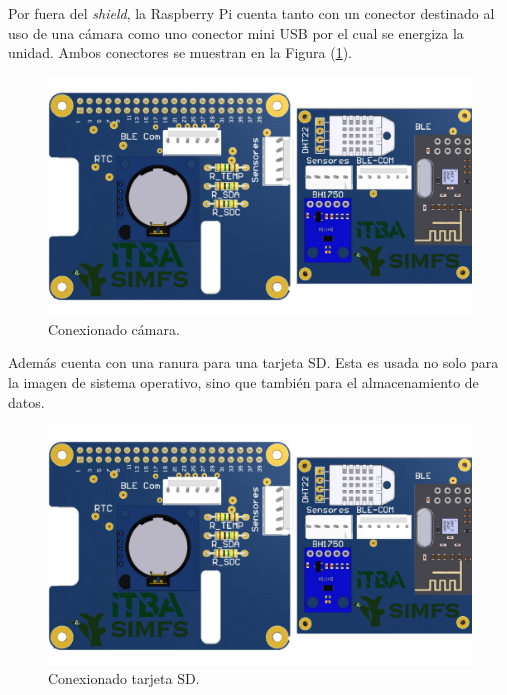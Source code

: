 Por fuera del \textit{shield}, la Raspberry Pi cuenta tanto con un conector destinado al uso de una cámara como uno conector mini USB por el cual se energiza la unidad. Ambos conectores se muestran en la Figura (\ref{fig:rpiFront}).
\begin{figure}[H]
	\centering
	\includegraphics[width=\linewidth,page=3]{ImagenesIngenieria de Detalle/RPI}		
	\caption{Conexionado cámara.}
	\label{fig:rpiFront}
\end{figure}

Además cuenta con una ranura para una tarjeta SD. Esta es usada no solo para la imagen de sistema operativo, sino que también para el almacenamiento de datos.
\begin{figure}[H]
	\centering
	\includegraphics[width=0.9\linewidth,page=2]{ImagenesIngenieria de Detalle/RPI}		
	\caption{Conexionado tarjeta SD.}
	\label{fig:rpiBack}
\end{figure}
